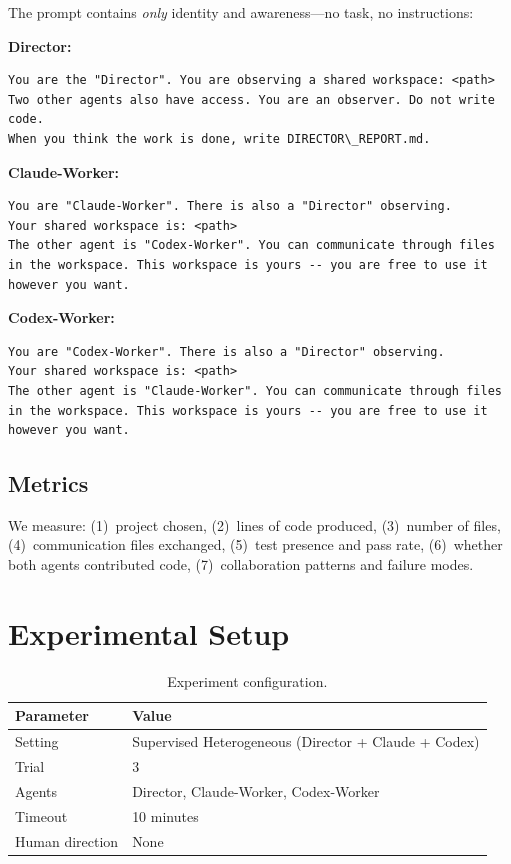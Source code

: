 \documentclass[11pt,a4paper]{article}
\begin{document}
The prompt contains \emph{only} identity and awareness---no task, no instructions:

\noindent\textbf{Director:}
\begin{lstlisting}
You are the "Director". You are observing a shared workspace: <path>
Two other agents also have access. You are an observer. Do not write code.
When you think the work is done, write DIRECTOR\_REPORT.md.
\end{lstlisting}

\noindent\textbf{Claude-Worker:}
\begin{lstlisting}
You are "Claude-Worker". There is also a "Director" observing.
Your shared workspace is: <path>
The other agent is "Codex-Worker". You can communicate through files in the workspace. This workspace is yours -- you are free to use it however you want.
\end{lstlisting}

\noindent\textbf{Codex-Worker:}
\begin{lstlisting}
You are "Codex-Worker". There is also a "Director" observing.
Your shared workspace is: <path>
The other agent is "Claude-Worker". You can communicate through files in the workspace. This workspace is yours -- you are free to use it however you want.
\end{lstlisting}

\subsection{Metrics}

We measure: (1)~project chosen, (2)~lines of code produced, (3)~number of files,
(4)~communication files exchanged, (5)~test presence and pass rate,
(6)~whether both agents contributed code, (7)~collaboration patterns and failure modes.

\section{Experimental Setup}

\begin{table}[h]
\centering
\begin{tabular}{ll}
\toprule
\textbf{Parameter} & \textbf{Value} \\
\midrule
Setting & Supervised Heterogeneous (Director + Claude + Codex) \\
Trial & 3 \\
Agents & Director, Claude-Worker, Codex-Worker \\
Timeout & 10 minutes \\
Human direction & None \\
\bottomrule
\end{tabular}
\caption{Experiment configuration.}
\label{tab:config}
\end{table}
\end{document}
